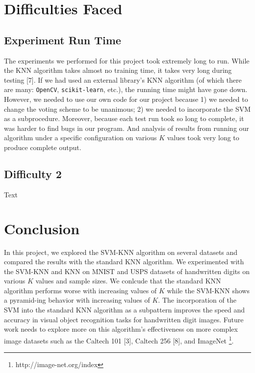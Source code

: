 \documentclass[11pt,letterpaper]{article}
\begin{document}
\section{Difficulties Faced}

\subsection{Experiment Run Time}

The experiments we performed for this project took extremely long to run. While the KNN algorithm takes almost no training time, it takes very long during testing [7]. If we had used an external library's KNN algorithm (of which there are many: {\tt OpenCV}, {\tt scikit-learn}, etc.), the running time might have gone down. However, we needed to use our own code for our project because 1) we needed to change the voting scheme to be unanimous; 2) we needed to incorporate the SVM as a subprocedure. Moreover, because each test run took so long to complete, it was harder to find bugs in our program. And analysis of results from running our algorithm under a specific configuration on various $K$ values took very long to produce complete output.

\subsection{Difficulty 2}

Text


\section{Conclusion}

In this project, we explored the SVM-KNN algorithm on several datasets and compared the results with the standard KNN algorithm. We experimented with the SVM-KNN and KNN on MNIST and USPS datasets of handwritten digits on various $K$ values and sample sizes. We conlcude that the standard KNN algorithm performs worse with increasing values of $K$ while the SVM-KNN shows a pyramid-ing behavior with increasing values of $K$. The incorporation of the SVM into the standard KNN algorithm as a subpattern improves the speed and accuracy in visual object recognition tasks for handwritten digit images. Future work needs to explore more on this algorithm's effectiveness on more complex image datasets such as the Caltech 101 [3], Caltech 256 [8], and ImageNet \footnote{http://image-net.org/index}.
\end{document}
